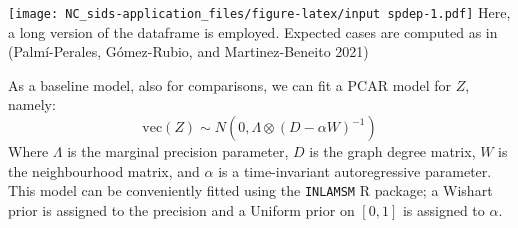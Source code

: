 \documentclass[
]{article}
\newenvironment{Shaded}{\begin{snugshade}}{\end{snugshade}}
\newcommand{\AttributeTok}[1]{\textcolor[rgb]{0.13,0.29,0.53}{#1}}
\newcommand{\DecValTok}[1]{\textcolor[rgb]{0.00,0.00,0.81}{#1}}
\newcommand{\FunctionTok}[1]{\textcolor[rgb]{0.13,0.29,0.53}{\textbf{#1}}}
\newcommand{\NormalTok}[1]{#1}
\newcommand{\OtherTok}[1]{\textcolor[rgb]{0.56,0.35,0.01}{#1}}
\newcommand{\SpecialCharTok}[1]{\textcolor[rgb]{0.81,0.36,0.00}{\textbf{#1}}}
\begin{document}
\texttt{[image: NC\_sids-application\_files/figure-latex/input spdep-1.pdf]}
Here, a long version of the dataframe is employed. Expected cases are
computed as in (Palmí-Perales, Gómez-Rubio, and Martinez-Beneito 2021)

\begin{Shaded}
\end{Shaded}

As a baseline model, also for comparisons, we can fit a PCAR model for
\(Z\), namely: \[
\mathrm{vec}(Z) \sim N(0, \Lambda \otimes(D - \alpha W)^{-1})
\] Where \(\Lambda\) is the marginal precision parameter, \(D\) is the
graph degree matrix, \(W\) is the neighbourhood matrix, and \(\alpha\)
is a time-invariant autoregressive parameter. This model can be
conveniently fitted using the \texttt{INLAMSM} R package; a Wishart
prior is assigned to the precision and a Uniform prior on \([0,1]\) is
assigned to \(\alpha\).
\end{document}
